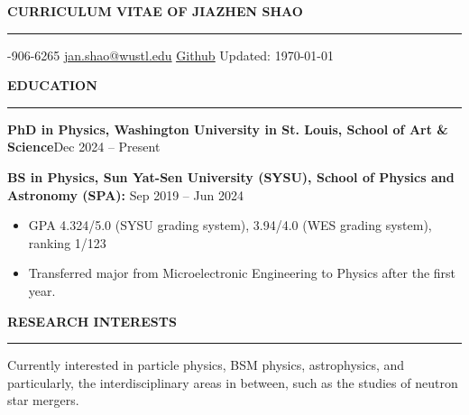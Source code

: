 \documentclass[11pt,letterpaper]{article}
\newcommand{\blue}{\color{blue}}
\begin{document}
\begingroup
\hfill{\MakeUppercase{\Huge\bfseries Curriculum Vitae of JIAZHEN SHAO}}\hfill
\break
\vspace{-0.5em}
\hrule
\endgroup

\begin{center}
\textbf{\Large\textbullet} {-906-6265} \quad \textbf{\Large\textbullet} \href{mailto:jan.shao@wustl.edu}{\ttfamily  jan.shao@wustl.edu} \quad \textbf{\Large\textbullet} \href{https://github.com/JiazhenShao}{\rmfamily \blue \underline{Github}} \quad \textbf{\Large\textbullet} Updated: \today 
\end{center}

\vspace{0.5em}


\textbf{\MakeUppercase{Education}}
\vspace{0.5em}
\hrule
\vspace{-0.3em}

\textbf{PhD in Physics, Washington University in St. Louis, School of Art \& Science}\hfill Dec 2024 {--} Present\\
\vspace{-1.3em}

\textbf{BS in Physics, Sun Yat-Sen University (SYSU), School of Physics and Astronomy (SPA):}  \hfill    Sep 2019 {--} Jun 2024\\
\vspace{-1.6em}
\begin{itemize}
\itemsep -5pt {}
\item GPA 4.324/5.0 (SYSU grading system), 3.94/4.0 (WES grading system), ranking 1/123
\item Transferred major from Microelectronic Engineering to Physics after the first year.
\end{itemize}

\vspace{1.6em}


\textbf{\MakeUppercase{Research Interests}}
\vspace{0.5em}
\hrule
\vspace{-0.3em}

Currently interested in particle physics, BSM physics, astrophysics, and particularly, the interdisciplinary areas in between, such as the studies of neutron star mergers. 


\vspace{1.6em}
\end{document}
